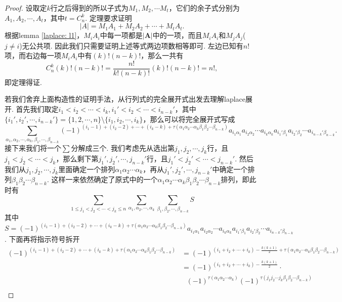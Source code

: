 \documentclass{article}
\newcommand{\mbf}[1]{\bm{#1}}
\begin{document}
\begin{proof}
设取定$k$行之后得到的所以子式为$M_1,M_2,\cdots M_t$，它们的余子式分别为$A_1,A_2,\cdots,A_t$，其中$t=C_n^k$. 定理要求证明
$$
|A| = M_1A_1 + M_2A_2 + \cdots + M_tA_t.
$$
根据lemma \ref{laplace: l1}，$M_iA_i$中每一项都是$|\mbf{A}|$中的一项，而且$M_iA_i$和$M_jA_j$($j \neq i$)无公共项. {\color{blue}因此我们只需要证明上述等式两边项数相等即可}. 左边已知有$n!$项，而右边每一项$M_iA_i$中有$(k)!(n-k)!$，那么一共有
$$
C_n^k (k)!(n-k)! = \frac{n!}{k!(n-k)!}(k)!(n-k)! = n!,
$$
即定理得证.

\newpage
{\color{blue}若我们舍弃上面构造性的证明手法，从行列式的完全展开式出发去理解laplace展开}. 首先我们取定$i_1 < i_2 < \cdots < i_k, i_1' < i_2 < \cdots < i_{n-k}'$，其中$\{i_1',i_2',\cdots, i_{n-k}'\} = \{1,2,\cdots,n\}\setminus\{i_1,i_2,\cdots,i_k\}$，那么可以将完全展开式写成
$$
\sum\limits_{\alpha_1,\alpha_2,\cdots,\alpha_k,\beta_1,\cdots,\beta_{n-k}}(-1)^{(i_1-1)+(i_2-2) +\cdots + (i_k-k) + \tau(\alpha_1\alpha_2\cdots\alpha_k\beta_1\beta_2\cdots \beta_{n-k})} a_{i_1\alpha_1}a_{i_2\alpha_2}\cdots a_{i_k\alpha_k}a_{i_1'\beta_1}a_{i_2'\beta_2}\cdots a_{i_{n-k}'\beta_{n-k}}.
$$
接下来我们将一个$\sum$分解成三个. 我们考虑先从选出第$j_1,j_2,\cdots,j_k$行，且$j_1 < j_2 < \cdots < j_k$，那么剩下第$j_1',j_2',\cdots,j_{n-k}'$行，且$j_1' < j_2' < \cdots < j_{n-k}'$. 然后我们从$j_1,j_2,\cdots,j_k$里面确定一个排列$\alpha_1\alpha_2\cdots\alpha_k$，再从$j_1',j_2',\cdots,j_{n-k}'$中确定一个排列$\beta_1\beta_2\cdots \beta_{n-k}$. 这样一来依然确定了原式中的一个$\alpha_1\alpha_2\cdots\alpha_k\beta_1\beta_2\cdots\beta_{n-k}$排列，即此时有
$$
\sum\limits_{1\leq j_1 < j_2 < \cdots < j_k \leq n} \sum\limits_{\alpha_1,\alpha_2,\cdots,\alpha_k} \sum\limits_{\beta_1,\beta_2,\cdots,\beta_{n-k}} S
$$
其中$S = (-1)^{(i_1-1)+(i_2-2) +\cdots + (i_k-k) + \tau(\alpha_1\alpha_2\cdots\alpha_k\beta_1\beta_2\cdots \beta_{n-k})} a_{i_1\alpha_1}a_{i_2\alpha_2}\cdots a_{i_k\alpha_k}a_{i_1'\beta_1}a_{i_2'\beta_2}\cdots a_{i_{n-k}'\beta_{n-k}}$. 下面再将指示符号拆开
$$
\begin{array}{ll}
(-1)^{(i_1-1)+(i_2-2) +\cdots + (i_k-k) + \tau(\alpha_1\alpha_2\cdots\alpha_k\beta_1\beta_2\cdots \beta_{n-k})} &= (-1)^{(i_1 + i_2 + \cdots + i_k) - \frac{k(k+1)}{2} + \tau(\alpha_1\alpha_2\cdots\alpha_k\beta_1\beta_2\cdots \beta_{n-k})} \\
&= (-1)^{(i_1 + i_2 + \cdots + i_k) - \frac{k(k+1)}{2}} \cdot \\
&~~~(-1)^{\tau(\alpha_1\alpha_2\cdots\alpha_k)}(-1)^{\tau(j_1j_2\cdots j_k\beta_1\beta_2\cdots\beta_{n-k})} \\

\end{array}$$
\end{proof}
\end{document}
